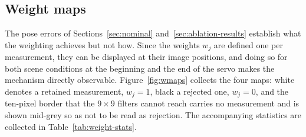 %
%
%
%
%
%

\subsection{Weight maps}
\label{sec:weight-maps}

The pose errors of Sections~\ref{sec:nominal} and~\ref{sec:ablation-results}
establish what the weighting achieves but not how. Since the weights $w_j$ are
defined one per measurement, they can be displayed at their image positions,
and doing so for both scene conditions at the beginning and the end of the
servo makes the mechanism directly observable.
Figure~\ref{fig:wmaps} collects the four maps: white denotes a retained
measurement, $w_j=1$, black a rejected one, $w_j=0$, and the ten-pixel border
that the $9\times9$ filters cannot reach carries no measurement and is shown
mid-grey so as not to be read as rejection. The accompanying statistics are
collected in Table~\ref{tab:weight-stats}.

